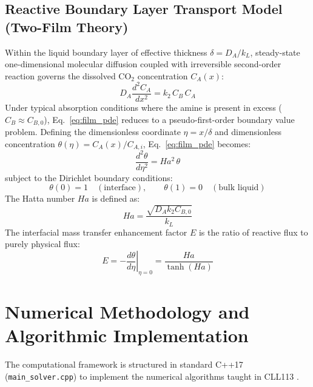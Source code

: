 \documentclass[11pt,a4paper]{article}
\begin{document}
\subsection{Reactive Boundary Layer Transport Model (Two-Film Theory)}
Within the liquid boundary layer of effective thickness $\delta = D_A / k_L$, steady-state one-dimensional molecular diffusion coupled with irreversible second-order reaction governs the dissolved $\text{CO}_2$ concentration $C_A(x)$:
\begin{equation}
D_A \frac{d^2 C_A}{dx^2} = k_2 \, C_B \, C_A
\label{eq:film_pde}
\end{equation}
Under typical absorption conditions where the amine is present in excess ($C_B \approx C_{B,0}$), Eq.~\eqref{eq:film_pde} reduces to a pseudo-first-order boundary value problem. Defining the dimensionless coordinate $\eta = x / \delta$ and dimensionless concentration $\theta(\eta) = C_A(x) / C_{A,i}$, Eq.~\eqref{eq:film_pde} becomes:
\begin{equation}
\frac{d^2 \theta}{d\eta^2} = Ha^2 \, \theta
\label{eq:dimensionless_film}
\end{equation}
subject to the Dirichlet boundary conditions:
\begin{equation}
\theta(0) = 1 \quad (\text{interface}), \qquad \theta(1) = 0 \quad (\text{bulk liquid})
\end{equation}
The Hatta number $Ha$ is defined as:
\begin{equation}
Ha = \frac{\sqrt{D_A k_2 C_{B,0}}}{k_L}
\label{eq:hatta_def}
\end{equation}
The interfacial mass transfer enhancement factor $E$ is the ratio of reactive flux to purely physical flux:
\begin{equation}
E = -\left. \frac{d\theta}{d\eta} \right|_{\eta = 0} = \frac{Ha}{\tanh(Ha)}
\label{eq:enhancement_analytical}
\end{equation}

\section{Numerical Methodology and Algorithmic Implementation}
The computational framework is structured in standard C++17 (\texttt{main\_solver.cpp}) to implement the numerical algorithms taught in CLL113 \cite{sarkar2026lecture, chapra2015numerical}.
\end{document}
